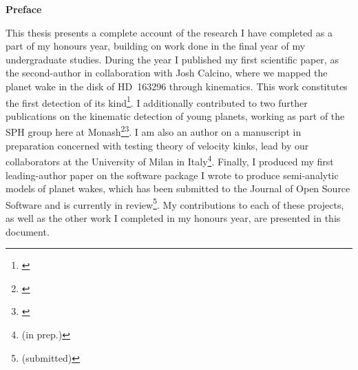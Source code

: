
\begin{center}
    
    {\Large \textbf{Preface}}
    
\end{center}

\noindent This thesis presents a complete account of the research I have completed as a part of my honours year, building on work done in the final year of my undergraduate studies.
During the year I published my first scientific paper, as the second-author in collaboration with Josh Calcino, where we mapped the planet wake in the disk of HD~163296 through kinematics.
This work constitutes the first detection of its kind\footnote{\citet{calcino2022}}. 
I additionally contributed to two further publications on the kinematic detection of young planets, working as part of the SPH group here at Monash\footnote{\citet{verrios2022}}\footnote{\cite{garg2022}}.
I am also an author on a manuscript in preparation concerned with testing theory of velocity kinks, lead by our collaborators at the University of Milan in Italy\footnote{\citeauthor{fasanoinprep.} (in prep.)}.
Finally, I produced my first leading-author paper on the software package I wrote to produce semi-analytic models of planet wakes, which has been submitted to the Journal of Open Source Software and is currently in review\footnote{\citeauthor{hildersubmitted} (submitted)}.
My contributions to each of these projects, as well as the other work I completed in my honours year, are presented in this document.


\newpage
